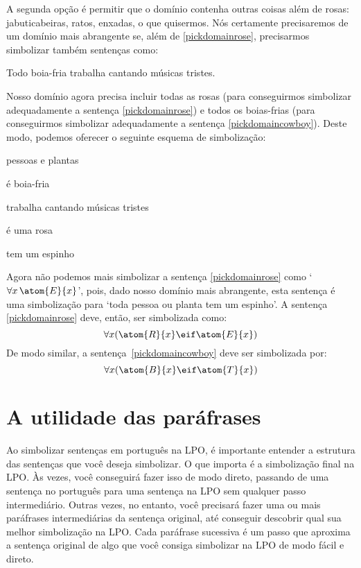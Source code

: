 A segunda opção é permitir que o domínio contenha outras coisas além de rosas: jabuticabeiras, ratos, enxadas, o que quisermos.
Nós certamente precisaremos de um domínio mais abrangente se, além de \ref{pickdomainrose}, precisarmos simbolizar também sentenças como:
	\begin{earg}
		\item[\ex{pickdomaincowboy}] Todo boia-fria trabalha cantando músicas tristes.
	\end{earg}
Nosso domínio agora precisa incluir todas as rosas (para conseguirmos simbolizar adequadamente a sentença \ref{pickdomainrose}) e todos os boias-frias (para conseguirmos simbolizar adequadamente a sentença \ref{pickdomaincowboy}). Deste modo, podemos oferecer o seguinte esquema de simbolização:
	\begin{center}
	\begin{ekey}
		\item[\text{domínio}] pessoas e plantas
		\item[\atom{B}{x}]  é boia-fria
		\item[\atom{T}{x}]  trabalha cantando músicas tristes
		\item[\atom{R}{x}]  é uma rosa
		\item[\atom{E}{x}]  tem um espinho
	\end{ekey}
	\end{center}
Agora não podemos mais simbolizar a sentença \ref{pickdomainrose} como `$\forall x\, \atom{E}{x}$', pois, dado nosso domínio mais abrangente, esta sentença é uma simbolização para `toda pessoa ou planta tem um espinho'.
A sentença \ref{pickdomainrose} deve, então, ser simbolizada como:
$$\forall x (\atom{R}{x} \eif \atom{E}{x})$$
De modo similar, a sentença~\ref{pickdomaincowboy} deve ser simbolizada por:
$$\forall x (\atom{B}{x} \eif \atom{T}{x})$$



\section{A utilidade das paráfrases}
Ao simbolizar sentenças em português na LPO, é importante entender a estrutura das sentenças que você deseja simbolizar.
O que importa é a simbolização final na LPO.
Às vezes, você conseguirá fazer isso de modo direto, passando de uma sentença no português para uma sentença na LPO sem qualquer passo intermediário.
Outras vezes, no entanto, você precisará fazer uma ou mais paráfrases intermediárias da sentença original, até conseguir descobrir qual sua melhor simbolização na LPO.
Cada paráfrase sucessiva é um passo que aproxima a sentença original de algo que você consiga simbolizar na LPO de modo fácil e direto.

